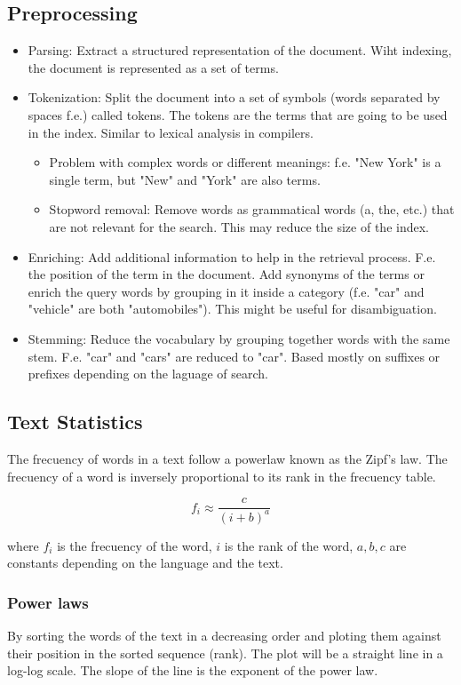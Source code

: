 \documentclass{article}
\begin{document}
\subsection{Preprocessing}
\begin{itemize}
    \item Parsing: Extract a structured representation of the document. Wiht indexing, the document is represented as a set of terms.
    \item Tokenization: Split the document into a set of symbols (words separated by spaces f.e.) called tokens. The tokens are the terms that are going to be used in the index.  Similar to lexical analysis in compilers.
    \begin{itemize}
        \item Problem with complex words or different meanings: f.e. "New York" is a single term, but "New" and "York" are also terms.
        \item Stopword removal: Remove words as grammatical words (a, the, etc.) that are not relevant for the search. This may reduce the size of the index.
    \end{itemize}
    \item Enriching: Add additional information to help in the retrieval process. F.e. the position of the term in the document. Add synonyms of the terms or enrich the query words by grouping in it inside a category (f.e. "car" and "vehicle" are both "automobiles"). This might be useful for disambiguation.
    \item Stemming: Reduce the vocabulary by grouping together words with the same stem. F.e. "car" and "cars" are reduced to "car". Based mostly on suffixes or prefixes depending on the laguage of search.
\end{itemize}
    
    \subsection{Text Statistics}
    The frecuency of words in a text follow a powerlaw known as the Zipf's law. The frecuency of a word is inversely proportional to its rank in the frecuency table.

    \begin{equation}
        f_i \approx \frac{c}{(i+b)^a}
    \end{equation}

    where $f_i$ is the frecuency of the word, $i$ is the rank of the word, $a, b, c$ are constants depending on the language and the text.

    \subsubsection{Power laws}
    By sorting the words of the text in a decreasing order and ploting them against their position in the sorted sequence (rank). The plot will be a straight line in a log-log scale. The slope of the line is the exponent of the power law.

    
\end{document}
